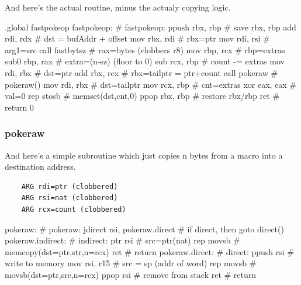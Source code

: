 And here's the actual routine, minus the actualy copying logic.

\begin{asm}
.global fastpokeop
fastpokeop:                                 # fastpokeop:
	ppush	rbx, rbp                    #   save rbx, rbp
	add	rdi, rdx                    #   dst = bufAddr + offset
	mov	rbx, rdi                    #   rbx=ptr
	mov	rdi, rsi                    #   arg1=src
	call	fastbytsz                   #   rax=bytes (clobbers r8)
	mov	rbp, rcx                    #   rbp=extras
	sub0	rbp, rax                    #   extra=(n-sz) (floor to 0)
	sub	rcx, rbp                    #   count -= extras
	mov	rdi, rbx                    #   dst=ptr
	add	rbx, rcx                    #   rbx=tailptr = ptr+count
	call	pokeraw                     #   pokeraw()
	mov	rdi, rbx                    #   dst=tailptr
	mov	rcx, rbp                    #   cnt=extras
	xor	eax, eax                    #   val=0
	rep	stosb                       #   memset(dst,cnt,0)
	ppop	rbx, rbp                    #   restore rbx/rbp
	ret                                 #   return 0
\end{asm}

\subsubsection{pokeraw}

And here's a simple subroutine which just copies n bytes from a macro
into a destination address.

\begin{verbatim}
    ARG rdi=ptr (clobbered)
    ARG rsi=nat (clobbered)
    ARG rcx=count (clobbered)
\end{verbatim}

\begin{asm}
pokeraw:                                    # pokeraw:
	jdirect	rsi, pokeraw.direct         #   if direct, then goto direct()
pokeraw.indirect:                           # indirect:
	ptr	rsi                         #   src=ptr(nat)
	rep	movsb                       #   memcopy(dst=ptr,str,n=rcx)
	ret                                 #   return
pokeraw.direct:                             # direct:
	ppush	rsi                         #   write to memory
	mov	rsi, r15                    #   src = sp (addr of word)
	rep	movsb                       #   movsb(dst=ptr,src,n=rcx)
	ppop	rsi                         #   remove from stack
	ret                                 #   return
\end{asm}

